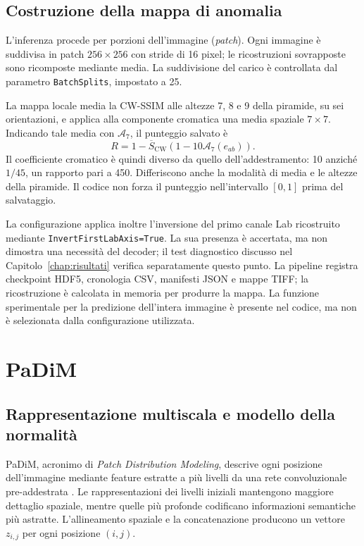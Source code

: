 \subsection{Costruzione della mappa di anomalia}

L'inferenza procede per porzioni dell'immagine (\textit{patch}). Ogni immagine è suddivisa in patch $256\times256$ con stride di 16 pixel; le ricostruzioni sovrapposte sono ricomposte mediante media. La suddivisione del carico è controllata dal parametro \texttt{BatchSplits}, impostato a 25.

La mappa locale media la CW-SSIM alle altezze 7, 8 e 9 della piramide, su sei orientazioni, e applica alla componente cromatica una media spaziale $7\times7$. Indicando tale media con $\mathcal A_7$, il punteggio salvato è
\begin{equation}
 R=1-\overline S_{\mathrm{CW}}\left(1-10\mathcal A_7(e_{ab})\right).
\end{equation}
Il coefficiente cromatico è quindi diverso da quello dell'addestramento: 10 anziché $1/45$, un rapporto pari a 450. Differiscono anche la modalità di media e le altezze della piramide. Il codice non forza il punteggio nell'intervallo $[0,1]$ prima del salvataggio.

La configurazione applica inoltre l'inversione del primo canale Lab ricostruito mediante \texttt{InvertFirstLabAxis=True}. La sua presenza è accertata, ma non dimostra una necessità del decoder; il test diagnostico discusso nel Capitolo~\ref{chap:risultati} verifica separatamente questo punto. La pipeline registra checkpoint HDF5, cronologia CSV, manifesti JSON e mappe TIFF; la ricostruzione è calcolata in memoria per produrre la mappa. La funzione sperimentale per la predizione dell'intera immagine è presente nel codice, ma non è selezionata dalla configurazione utilizzata.

\section{PaDiM}
\label{sec:cap3-padim}

\subsection{Rappresentazione multiscala e modello della normalità}

PaDiM, acronimo di \textit{Patch Distribution Modeling}, descrive ogni posizione dell'immagine mediante feature estratte a più livelli da una rete convoluzionale pre-addestrata \cite{Defard_et_al._2021}. Le rappresentazioni dei livelli iniziali mantengono maggiore dettaglio spaziale, mentre quelle più profonde codificano informazioni semantiche più astratte. L'allineamento spaziale e la concatenazione producono un vettore $z_{i,j}$ per ogni posizione $(i,j)$.

